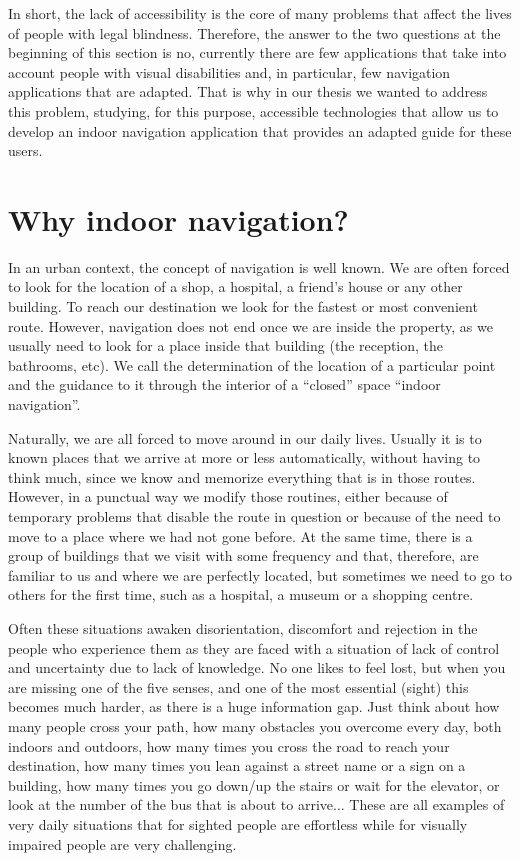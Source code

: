 In short, the lack of accessibility is the core of many problems that affect the lives of people with legal blindness. Therefore, the answer to the two questions at the beginning of this section is no, currently there are few applications that take into account people with visual disabilities and, in particular, few navigation applications that are adapted. That is why in our thesis we wanted to address this problem, studying, for this purpose, accessible technologies that allow us to develop an indoor navigation application that provides an adapted guide for these users.

\section{Why indoor navigation?}
\label{sec:motivation}

In an urban context, the concept of navigation is well known. We are often forced to look for the location of a shop, a hospital, a friend's house or any other building. To reach our destination we look for the fastest or most convenient route. However, navigation does not end once we are inside the property, as we usually need to look for a place inside that building (the reception, the bathrooms, etc). We call the determination of the location of a particular point and the guidance to it through the interior of a ``closed'' space ``indoor navigation''.

Naturally, we are all forced to move around in our daily lives. Usually it is to known places that we arrive at more or less automatically, without having to think much, since we know and memorize everything that is in those routes. However, in a punctual way we modify those routines, either because of temporary problems that disable the route in question or because of the need to move to a place where we had not gone before. At the same time, there is a group of buildings that we visit with some frequency and that, therefore, are familiar to us and where we are perfectly located, but sometimes we need to go to others for the first time, such as a hospital, a museum or a shopping centre. 

Often these situations awaken disorientation, discomfort and rejection in the people who experience them as they are faced with a situation of lack of control and uncertainty due to lack of knowledge. No one likes to feel lost, but when you are missing one of the five senses, and one of the most essential (sight) this becomes much harder, as there is a huge information gap. Just think about how many people cross your path, how many obstacles you overcome every day, both indoors and outdoors, how many times you cross the road to reach your destination, how many times you lean against a street name or a sign on a building, how many times you go down/up the stairs or wait for the elevator, or look at the number of the bus that is about to arrive... These are all examples of very daily situations that for sighted people are effortless while for visually impaired people are very challenging. 

